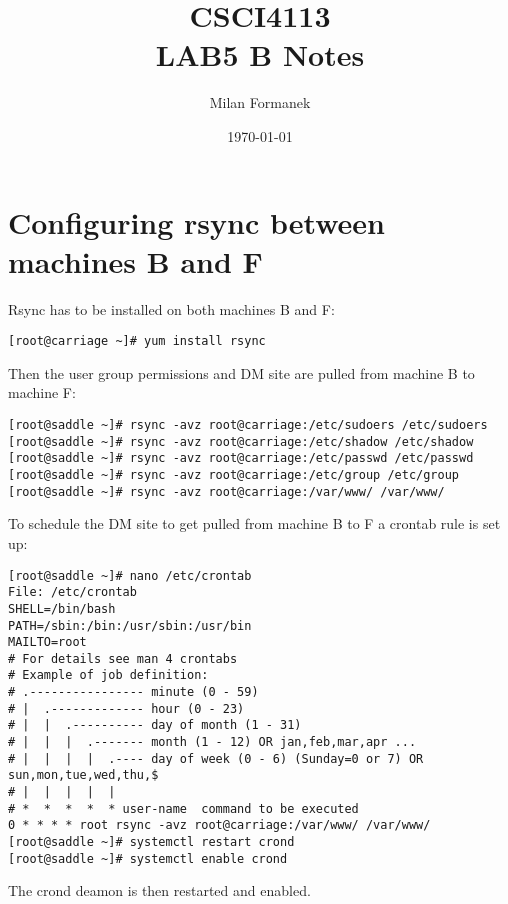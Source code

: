 \documentclass[11pt,onside]{article}
\title{\blue CSCI4113 \\
\blueb LAB5 B Notes}
\author{Milan Formanek}
\date{\today} %
\begin{document}
\maketitle
\section{Configuring rsync between machines B and F}
Rsync has to be installed on both machines B and F:
\begin{lstlisting}
[root@carriage ~]# yum install rsync
\end{lstlisting}
Then the user group permissions and DM site are pulled from machine B to machine F:
\begin{lstlisting}
[root@saddle ~]# rsync -avz root@carriage:/etc/sudoers /etc/sudoers
[root@saddle ~]# rsync -avz root@carriage:/etc/shadow /etc/shadow
[root@saddle ~]# rsync -avz root@carriage:/etc/passwd /etc/passwd
[root@saddle ~]# rsync -avz root@carriage:/etc/group /etc/group
[root@saddle ~]# rsync -avz root@carriage:/var/www/ /var/www/
\end{lstlisting}
To schedule the DM site to get pulled from machine B to F a crontab rule is set up:
\begin{lstlisting}
[root@saddle ~]# nano /etc/crontab
File: /etc/crontab
SHELL=/bin/bash
PATH=/sbin:/bin:/usr/sbin:/usr/bin
MAILTO=root
# For details see man 4 crontabs
# Example of job definition:
# .---------------- minute (0 - 59)
# |  .------------- hour (0 - 23)
# |  |  .---------- day of month (1 - 31)
# |  |  |  .------- month (1 - 12) OR jan,feb,mar,apr ...
# |  |  |  |  .---- day of week (0 - 6) (Sunday=0 or 7) OR sun,mon,tue,wed,thu,$
# |  |  |  |  |
# *  *  *  *  * user-name  command to be executed
0 * * * * root rsync -avz root@carriage:/var/www/ /var/www/
[root@saddle ~]# systemctl restart crond
[root@saddle ~]# systemctl enable crond
\end{lstlisting}
The crond deamon is then restarted and enabled. 
\end{document}
